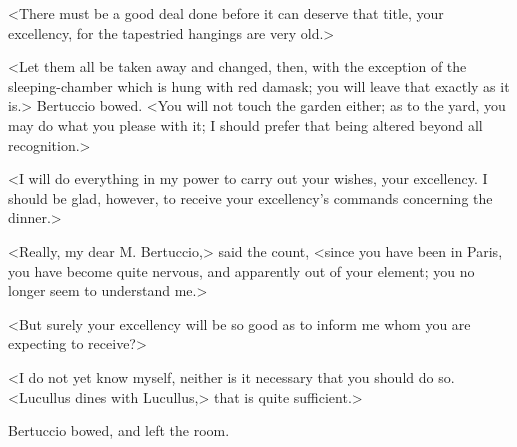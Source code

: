  <There must be a good deal done before it can deserve that title, your excellency, for the tapestried hangings are very old.> 

 <Let them all be taken away and changed, then, with the exception of the sleeping-chamber which is hung with red damask; you will leave that exactly as it is.> Bertuccio bowed. <You will not touch the garden either; as to the yard, you may do what you please with it; I should prefer that being altered beyond all recognition.> 

 <I will do everything in my power to carry out your wishes, your excellency. I should be glad, however, to receive your excellency's commands concerning the dinner.> 

 <Really, my dear M. Bertuccio,> said the count, <since you have been in Paris, you have become quite nervous, and apparently out of your element; you no longer seem to understand me.> 

 <But surely your excellency will be so good as to inform me whom you are expecting to receive?> 

 <I do not yet know myself, neither is it necessary that you should do so. <Lucullus dines with Lucullus,> that is quite sufficient.> 

 Bertuccio bowed, and left the room. 